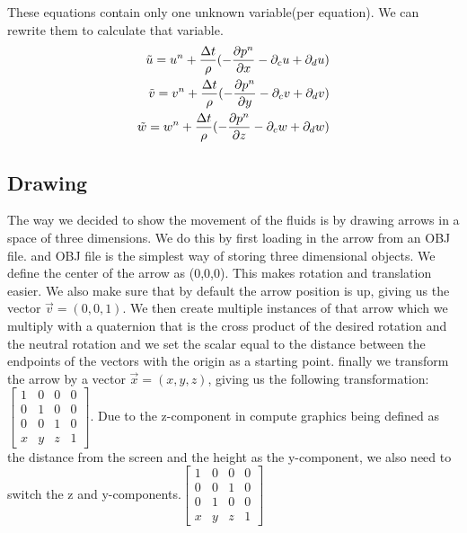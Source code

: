 \documentclass{article}
\begin{document}
These equations contain only one unknown variable(per equation). We can rewrite them to calculate that variable. 
\[
  \begin{split}
  \tilde{u}=u^{n}+\frac{\Delta t}{\rho}(-\pdv{p^{n}}{x}-\partial _cu +\partial _du)\\
  \tilde{v}=v^{n}+\frac{\Delta t}{\rho}(-\pdv{p^{n}}{y}-\partial _cv +\partial _dv)\\
  \tilde{w}=w^{n}+\frac{\Delta t}{\rho}(-\pdv{p^{n}}{z}-\partial _cw +\partial _dw)
  \end{split}
\]

\subsection{Drawing}
The way we decided to show the movement of the fluids is by drawing arrows in a space of three dimensions. We do this by first loading in the arrow from an OBJ file. and OBJ file is the simplest way of storing three dimensional objects. We define the center of the arrow as (0,0,0). This makes rotation and translation easier. We also make sure that by default the arrow position is up, giving us the vector $\vec{v}=(0,0,1)$. We then create multiple instances of that arrow which we multiply with a quaternion that is the cross product of the desired rotation and the neutral rotation and we set the scalar equal to the distance between the endpoints of the vectors with the origin as a starting point. finally we transform the arrow by a vector $\vec{x}=(x,y,z)$, giving us the following transformation: 
$\begin{bmatrix}
1 & 0 & 0 & 0\\
0 & 1 & 0 & 0\\
0 & 0 & 1 & 0\\
x & y & z & 1
\end{bmatrix}$. Due to the z-component in compute graphics being defined as the distance from the screen and the height as the y-component, we also need to switch the z and y-components.$\begin{bmatrix}
1 & 0 & 0 & 0\\
0 & 0 & 1 & 0\\
0 & 1 & 0 & 0\\
x & y & z & 1
\end{bmatrix}$
\end{document}
